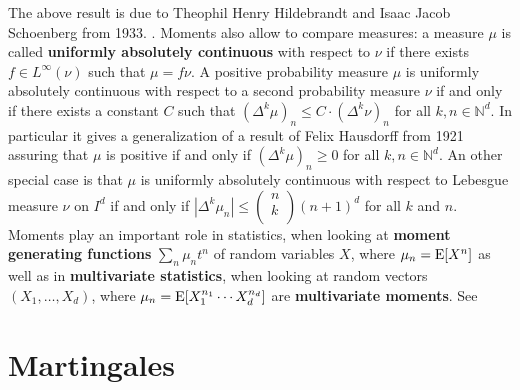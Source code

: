 \documentclass[12pt]{amsart}
\newcommand{\NN}{\mathbb{N}} \newcommand{\ZZ}{\mathbb{Z}} \newcommand{\RR}{\mathbb{R}} \newcommand{\CC}{\mathbb{C}}
\begin{document}
The above result is due to Theophil Henry Hildebrandt and Isaac Jacob Schoenberg from 1933.
\cite{HiSc33}. Moments also allow to compare measures: a measure $\mu$ is called
{\bf uniformly absolutely continuous} with respect to $\nu$
if there exists $f \in L^{\infty}(\nu)$ such that $\mu = f \nu$.
A positive probability measure $\mu$ is uniformly absolutely continuous with respect to
a second probability measure $\nu$ if and only if there exists a constant $C$ such that
$(\Delta^k \mu)_n \leq C \cdot (\Delta^k \nu)_n$ for all $k,n \in \NN^d$.
In particular it gives a generalization of a result of Felix Hausdorff from 1921
\cite{Hau21} assuring that $\mu$ is positive if and only if
$(\Delta^k \mu)_n \geq 0$ for all $k,n \in \NN^d$.
An other special case is that $\mu$ is uniformly absolutely continuous with respect
to Lebesgue measure $\nu$ on $I^d$ if and only if
$|\Delta^k \mu_n| \leq  \left( \begin{array}{c} n \\ k \\ \end{array} \right) (n+1)^d$
for all $k$ and $n$. Moments play an important role in statistics,
when looking at {\bf moment generating functions} $\sum_n \mu_n t^n$  of random variables $X$, where
$\mu_n = {\rm E}[X^n]$ as well as in {\bf multivariate statistics}, when looking
at random vectors $(X_1, \dots, X_d)$, where $\mu_n =  {\rm E}[X_1^{n_1} \cdots X_d^{n_d}]$
are {\bf multivariate moments}.  See \cite{knillprobability,Schmuedgen2017}

\section{Martingales}
\end{document}
